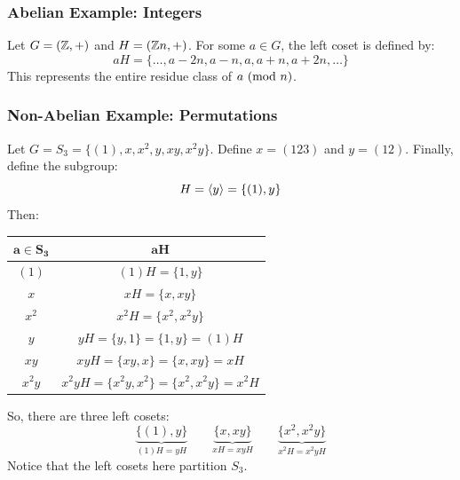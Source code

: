 \documentclass[letterpaper]{article}
\begin{document}
\subsubsection{Abelian Example: Integers}
Let $G = (\mathbb{Z}, +)$ and $H = (\mathbb{Z} n, +)$. For some $a \in G$, the left coset is defined by: 
\[aH = \{\dots, a - 2n, a - n, a, a + n, a + 2n, \dots\}\]
This represents the entire residue class of $a \ (\mathrm{mod}\ n)$. 

\subsubsection{Non-Abelian Example: Permutations}
Let $G = S_3 = \{(1), x, x^2, y, xy, x^2 y\}$. Define $x = (123)$ and $y = (12)$. Finally, define the subgroup:
\[H = \langle y \rangle = \{(1), y\}\] 
Then: 
\begin{center}
    \begin{tabular}{c|c}
        $\mathbf{a \in S_3}$ & $\mathbf{aH}$ \\ 
        \hline 
        $(1)$       & $(1)H = \{1, y\}$ \\ 
        $x$         & $xH = \{x, xy\}$ \\ 
        $x^2$       & $x^2 H = \{x^2, x^2 y\}$ \\ 
        $y$         & $yH = \{y, 1\} = \{1, y\} = (1)H$ \\ 
        $xy$        & $xyH = \{xy, x\} = \{x, xy\} = xH$ \\ 
        $x^2 y$     & $x^2 yH = \{x^2 y, x^2\} = \{x^2, x^2 y\} = x^2 H$
    \end{tabular}
\end{center}
So, there are three left cosets:
\[\underbrace{\{(1), y\}}_{(1)H = yH} \qquad \underbrace{\{x, xy\}}_{xH = xyH} \qquad \underbrace{\{x^2, x^2 y\}}_{x^2 H = x^2 yH}\]
Notice that the left cosets here partition $S_3$.
\end{document}
